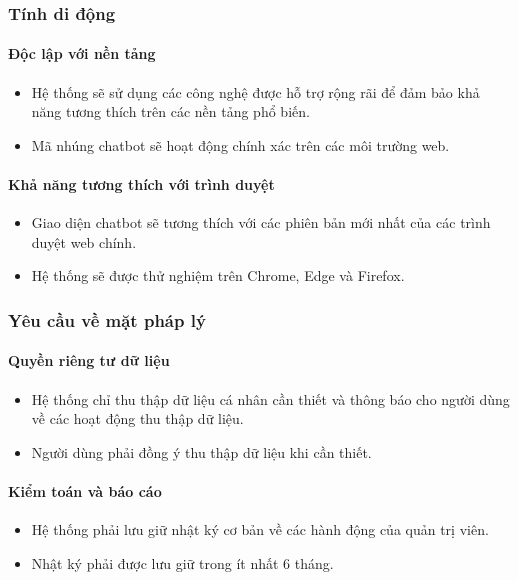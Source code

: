 \subsubsection{Tính di động}

\paragraph{Độc lập với nền tảng}
\begin{itemize}
    \item Hệ thống sẽ sử dụng các công nghệ được hỗ trợ rộng rãi để đảm bảo khả năng tương thích trên các nền tảng phổ biến.
    \item Mã nhúng chatbot sẽ hoạt động chính xác trên các môi trường web.
\end{itemize}

\paragraph{Khả năng tương thích với trình duyệt}
\begin{itemize}
    \item Giao diện chatbot sẽ tương thích với các phiên bản mới nhất của các trình duyệt web chính.
    \item Hệ thống sẽ được thử nghiệm trên Chrome, Edge và Firefox.
\end{itemize}

\subsubsection{Yêu cầu về mặt pháp lý}

\paragraph{Quyền riêng tư dữ liệu}
\begin{itemize}
    \item Hệ thống chỉ thu thập dữ liệu cá nhân cần thiết và thông báo cho người dùng về các hoạt động thu thập dữ liệu.
    \item Người dùng phải đồng ý thu thập dữ liệu khi cần thiết.
\end{itemize}

\paragraph{Kiểm toán và báo cáo}
\begin{itemize}
    \item Hệ thống phải lưu giữ nhật ký cơ bản về các hành động của quản trị viên.
    \item Nhật ký phải được lưu giữ trong ít nhất 6 tháng.
\end{itemize}

